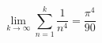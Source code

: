 

\fontsize{25}{25}\selectfont
\[
            
            
            
            
           \lim_{k \to \infty} \sum_{n = 1}^{k}
           \frac{1}{n^{4}} = \frac{\pi^{4}}{90} 
            
            
            
            
            
            
\]


